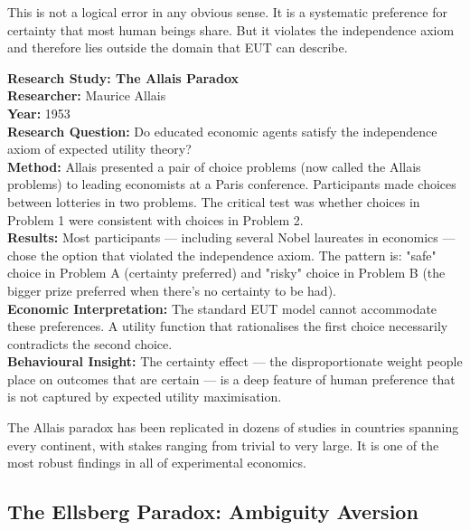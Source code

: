 \documentclass[12pt, letterpaper]{article}
\begin{document}
This is not a logical error in any obvious sense. It is a systematic preference for certainty that most human beings share. But it violates the independence axiom and therefore lies outside the domain that EUT can describe.

\begin{researchbox}
\textbf{Research Study: The Allais Paradox}\\[4pt]

\textbf{Researcher:} Maurice Allais\\[4pt]
\textbf{Year:} 1953\\[4pt]
\textbf{Research Question:} Do educated economic agents satisfy the independence axiom of expected utility theory?\\[4pt]
\textbf{Method:} Allais presented a pair of choice problems (now called the Allais problems) to leading economists at a Paris conference. Participants made choices between lotteries in two problems. The critical test was whether choices in Problem 1 were consistent with choices in Problem 2.\\[4pt]
\textbf{Results:} Most participants --- including several Nobel laureates in economics --- chose the option that violated the independence axiom. The pattern is: "safe" choice in Problem A (certainty preferred) and "risky" choice in Problem B (the bigger prize preferred when there's no certainty to be had).\\[4pt]
\textbf{Economic Interpretation:} The standard EUT model cannot accommodate these preferences. A utility function that rationalises the first choice necessarily contradicts the second choice.\\[4pt]
\textbf{Behavioural Insight:} The certainty effect --- the disproportionate weight people place on outcomes that are certain --- is a deep feature of human preference that is not captured by expected utility maximisation.\\[4pt]
\end{researchbox}

The Allais paradox has been replicated in dozens of studies in countries spanning every continent, with stakes ranging from trivial to very large. It is one of the most robust findings in all of experimental economics.

\medskip


\subsection{The Ellsberg Paradox: Ambiguity Aversion}
\end{document}
